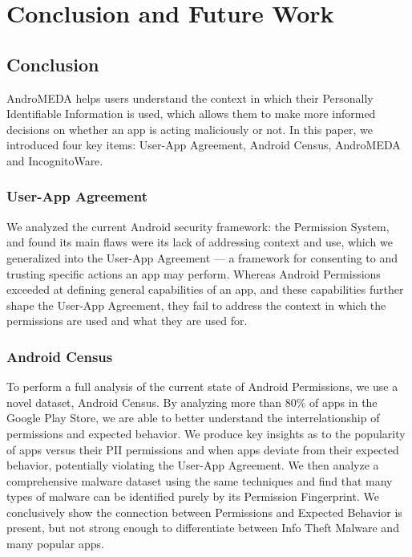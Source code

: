 \chapter{Conclusion and Future Work}
\label{sec:conclusion}
\section{Conclusion}
AndroMEDA helps users understand the context in which their Personally Identifiable Information is used, which allows them to make more informed decisions on whether an app is acting maliciously or not. In this paper, we introduced four key items: User-App Agreement, Android Census, AndroMEDA and IncognitoWare.

\subsection{User-App Agreement}

We analyzed the current Android security framework: the Permission System, and found its main flaws were its lack of addressing context and use, which we generalized into the User-App Agreement --- a framework for consenting to and trusting specific actions an app may perform. Whereas Android Permissions exceeded at defining general capabilities of an app, and these capabilities further shape the User-App Agreement, they fail to address the context in which the permissions are used and what they are used for.

\subsection{Android Census}
To perform a full analysis of the current state of Android Permissions, we use a novel dataset, Android Census. By analyzing more than 80\% of apps in the Google Play Store, we are able to better understand the interrelationship of permissions and expected behavior. We produce key insights as to the popularity of apps versus their PII permissions and when apps deviate from their expected behavior, potentially violating the User-App Agreement. We then analyze a comprehensive malware dataset using the same techniques and find that many types of malware can be identified purely by its Permission Fingerprint. We conclusively show the connection between Permissions and Expected Behavior is present, but not strong enough to differentiate between Info Theft Malware and many popular apps.

